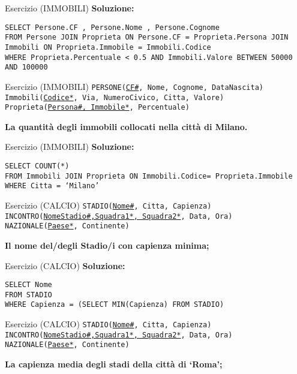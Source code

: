 \begin{frame}{Esercizio (IMMOBILI)}
    \textbf{Soluzione:}
    \vspace{1em}
    
    \texttt{SELECT Persone.CF , Persone.Nome , Persone.Cognome\\FROM Persone JOIN Proprieta ON Persone.CF = Proprieta.Persona JOIN Immobili ON Proprieta.Immobile = Immobili.Codice\\WHERE Proprieta.Percentuale < 0.5 AND Immobili.Valore BETWEEN 50000 AND 100000}
\end{frame}
\begin{frame}{Esercizio (IMMOBILI) } 
    \texttt{PERSONE(\underline{CF\#}, Nome, Cognome, DataNascita)\\
    Immobili(\underline{Codice*}, Via, NumeroCivico, Citta, Valore)\\
    Proprieta(\underline{Persona\#, Immobile*}, Percentuale)}
    \vspace{1em}
    
    \textbf{La quantit\`a degli immobili collocati nella citt\`a di Milano.}
\end{frame}

\begin{frame}{Esercizio (IMMOBILI)}
    \textbf{Soluzione:}
    \vspace{1em}
    
    \texttt{SELECT COUNT(*) \\FROM Immobili JOIN Proprieta ON Immobili.Codice= Proprieta.Immobile \\WHERE Citta = `Milano'}
\end{frame}
\begin{frame}{Esercizio (CALCIO) } 
    \texttt{STADIO(\underline{Nome\#}, Citta, Capienza)\\
    INCONTRO(\underline{NomeStadio\#,Squadra1*, Squadra2*}, Data, Ora)\\
    NAZIONALE(\underline{Paese*}, Continente)}
    \vspace{1em}
    
    \textbf{Il nome del/degli Stadio/i con capienza minima;}
\end{frame}

\begin{frame}{Esercizio (CALCIO)}
    \textbf{Soluzione:}
    \vspace{1em}
    
    \texttt{SELECT Nome \\FROM STADIO\\WHERE Capienza = (SELECT MIN(Capienza) FROM STADIO)}
\end{frame}
\begin{frame}{Esercizio (CALCIO) } 
    \texttt{STADIO(\underline{Nome\#}, Citta, Capienza)\\
    INCONTRO(\underline{NomeStadio\#,Squadra1*, Squadra2*}, Data, Ora)\\
    NAZIONALE(\underline{Paese*}, Continente)}
    \vspace{1em}
    
    \textbf{La capienza media degli stadi della citt\`a di `Roma';}
\end{frame}

